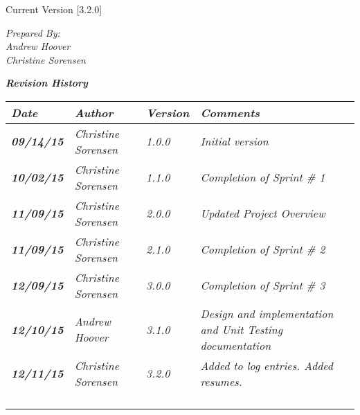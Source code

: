 


Current Version [3.2.0]
\vspace*{5mm}

{\color{MSBlue3}
\noindent
\textit{Prepared By:}\\
\textit{Andrew Hoover}\\
\textit{Christine Sorensen}
}

\vfill
\noindent
{\color{color02} \textit{\textbf{Revision History}}}\\
\begin{tabular}{|>{\raggedright}p{1.5cm}|>{\raggedright}p{3cm}|>{\raggedright}p{1.5cm}|>{\raggedright}p{9cm}|}
\hline
\textit{\textbf{Date}} &  \textit{\textbf{Author}} & \textit{\textbf{Version}} & \textit{\textbf{Comments}}\tabularnewline
\hline
\textit{\textbf{09/14/15}} & \textit{Christine Sorensen} & \textit{1.0.0} & \textit{Initial version}\tabularnewline
\hline
\textit{\textbf{10/02/15}} & \textit{Christine Sorensen} & \textit{1.1.0} & \textit{Completion of Sprint \# 1}\tabularnewline
\hline
\textit{\textbf{11/09/15}} & \textit{Christine Sorensen} & \textit{2.0.0} & \textit{Updated Project Overview}\tabularnewline
\hline
\textit{\textbf{11/09/15}} & \textit{Christine Sorensen} & \textit{2.1.0} & \textit{Completion of Sprint \# 2}\tabularnewline
\hline
\textit{\textbf{12/09/15}} & \textit{Christine Sorensen} & \textit{3.0.0} & \textit{Completion of Sprint \# 3}\tabularnewline
\hline
\textit{\textbf{12/10/15}} & \textit{Andrew Hoover} & \textit{3.1.0} & \textit{Design and implementation and Unit Testing documentation}\tabularnewline
\hline
\textit{\textbf{12/11/15}} & \textit{Christine Sorensen} & \textit{3.2.0} & \textit{Added to log entries. Added resumes.}\tabularnewline
 \hline
 &  &  & \tabularnewline
\hline
 &  &  & \tabularnewline
\hline
 &  &  & \tabularnewline
\hline
 &  &  & \tabularnewline
\hline
\end{tabular}
\vfill

